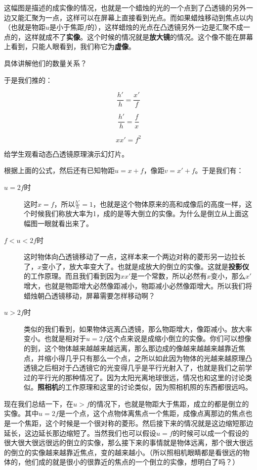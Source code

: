 \documentclass[12pt]{exam}
\begin{document}
这幅图是描述的成实像的情况，也就是一个蜡烛的光的一个点到了凸透镜的另外一边又能汇聚为一点，这样可以在屏幕上直接看到光点。而如果蜡烛移动到焦点以内（也就是物距$u$是小于焦距$f$的），这样蜡烛的光点在凸透镜另外一边是汇聚不成一点的，这样就成不了\textbf{实像}。这个时候的情况就是\textbf{放大镜}的情况。这个像不能在屏幕上看到，只能人眼看到，我们称它为\textbf{虚像}。


具体讲解他们的数量关系？

于是我们推的：
\begin{solutionorbox}[15ex]
\begin{equation*}
\frac{h'}{h}=\frac{x'}{f}
\end{equation*}

\begin{equation*}
\frac{h'}{h}=\frac{f}{x}
\end{equation*}

\begin{equation*}
xx'=f^2
\end{equation*}
\end{solutionorbox}

给学生观看动态凸透镜原理演示幻灯片。

根据上面的公式，然后还有已知物距$u=x+f$，像距$v=x'+f$。于是我们有：
\begin{description}
\item[$u=2f$时] 这时$x=f$，所以$\frac{h'}{h}=1$，也就是这个物体原来的高和成像后的高度一样，这个时候我们称放大率为1，成的是等大倒立的实像。为什么是倒立从上面这幅图一眼就看出来了。
\item[$f<u<2f$时] 这时物体向凸透镜移动了一点，这样本来一个两边对称的菱形另一边拉长了，$x$变小了，放大率变大了。也就是成放大的倒立的实像。这就是\textbf{投影仪}的工作原理。而且我们看到因为$xx'$是一个常数，所以必然有$x$变小，那么$x'$增大，也就是物距增大必然像距减小，物距减小必然像距增大。所以我们将蜡烛朝凸透镜移动，屏幕需要怎样移动啊？
\item[$u>2f$时] 类似的我们看到，如果物体远离凸透镜，那么物距增大，像距减小。放大率变小。也就是相对于$u=2f$这个点来说是成缩小倒立的实像。你们可以想像的到，这个物体越来越越来越远离，那么那边成的像越来越越来越靠近焦点，并缩小得几乎只有那么一个点，之所以如此因为物体的光越来越原理凸透镜之后相对于凸透镜它的光变得几乎是平行光射入了，也就是我们之前学过的平行光的那种情况了。因为太阳光离地球很远，情况也和这里的讨论类似。\textbf{照相机}的工作原理和这里的讨论类似，因为照相机照的东西都很远吗。
\end{description}

现在我们总结一下，在$u>f$的情况下，也就是物距大于焦距，成立的都是倒立的实像。其中$u=2f$是一个点，这个点物体离焦点一个焦距，成像点离那边的焦点也是一个焦距，这个时候是一个很对称的菱形。然后接下来的情况就是这边缩短那边延长，这边延长那边缩短了。当然我们也可以假设$u=f$的时候可以成一个假设的很大很大很远很远的倒立的实像，那么接下来的事情就是物体远离，那个很大很远的倒立的实像越来越靠近焦点，变的越来越小。（所以照相机眼睛都是看很远的物体的，他们成的就是很小的很靠近的焦点的一个倒立的实像，想明白了吗？）
\end{document}
